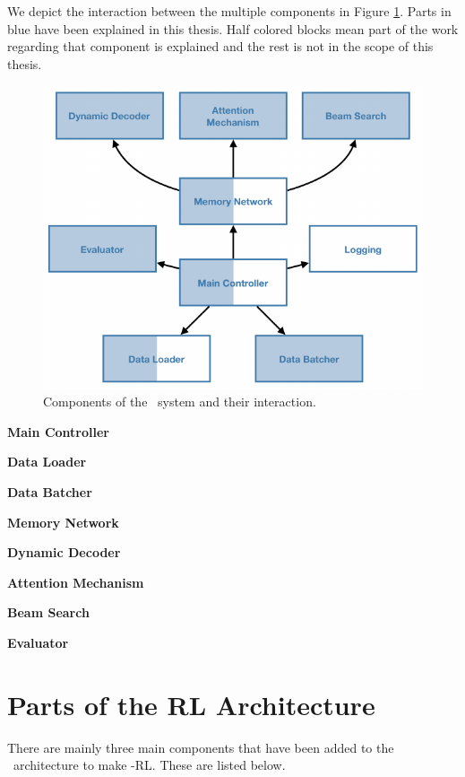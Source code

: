 We depict the interaction between the multiple components in Figure \ref{fig:sys_comp}. Parts in blue have been explained in this thesis. Half colored blocks mean part of the work regarding that component is explained and the rest is not in the scope of this thesis.

\begin{figure}[!ht]
\centering
\includegraphics[scale=1.0]{assets/figures/components_orig.pdf}
\caption{Components of the \sys\ system and their interaction.}
\label{fig:sys_comp}
\end{figure}

\noindent\textbf{Main Controller}

\noindent\textbf{Data Loader}

\noindent\textbf{Data Batcher}

\noindent\textbf{Memory Network}

\noindent\textbf{Dynamic Decoder}

\noindent\textbf{Attention Mechanism}

\noindent\textbf{Beam Search}

\noindent\textbf{Evaluator}

\section{Parts of the \sys\-RL Architecture}

There are mainly three main components that have been added to the \sys\ architecture to make \sys -RL. These are listed below.

